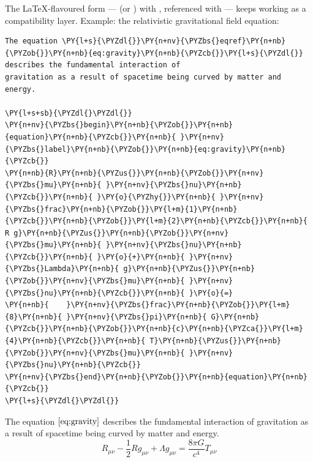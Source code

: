 \documentclass[a4paper,twoside]{article}
\begin{document}
The \LaTeX{}-flavoured form ---  (or )
with , referenced with  --- keeps working as a
compatibility layer. Example: the relativistic gravitational field equation:
\begin{tscode}[lang=latex, engine=pygments]
\begin{Verbatim}[commandchars=\\\{\},breaklines, breakanywhere, commandchars=\\\{\}]
The equation \PY{l+s}{\PYZdl{}}\PY{n+nv}{\PYZbs{}eqref}\PY{n+nb}{\PYZob{}}\PY{n+nb}{eq:gravity}\PY{n+nb}{\PYZcb{}}\PY{l+s}{\PYZdl{}} describes the fundamental interaction of
gravitation as a result of spacetime being curved by matter and energy.

\PY{l+s+sb}{\PYZdl{}\PYZdl{}}
\PY{n+nv}{\PYZbs{}begin}\PY{n+nb}{\PYZob{}}\PY{n+nb}{equation}\PY{n+nb}{\PYZcb{}}\PY{n+nb}{ }\PY{n+nv}{\PYZbs{}label}\PY{n+nb}{\PYZob{}}\PY{n+nb}{eq:gravity}\PY{n+nb}{\PYZcb{}}
\PY{n+nb}{R}\PY{n+nb}{\PYZus{}}\PY{n+nb}{\PYZob{}}\PY{n+nv}{\PYZbs{}mu}\PY{n+nb}{ }\PY{n+nv}{\PYZbs{}nu}\PY{n+nb}{\PYZcb{}}\PY{n+nb}{ }\PY{o}{\PYZhy{}}\PY{n+nb}{ }\PY{n+nv}{\PYZbs{}frac}\PY{n+nb}{\PYZob{}}\PY{l+m}{1}\PY{n+nb}{\PYZcb{}}\PY{n+nb}{\PYZob{}}\PY{l+m}{2}\PY{n+nb}{\PYZcb{}}\PY{n+nb}{ R g}\PY{n+nb}{\PYZus{}}\PY{n+nb}{\PYZob{}}\PY{n+nv}{\PYZbs{}mu}\PY{n+nb}{ }\PY{n+nv}{\PYZbs{}nu}\PY{n+nb}{\PYZcb{}}\PY{n+nb}{ }\PY{o}{+}\PY{n+nb}{ }\PY{n+nv}{\PYZbs{}Lambda}\PY{n+nb}{ g}\PY{n+nb}{\PYZus{}}\PY{n+nb}{\PYZob{}}\PY{n+nv}{\PYZbs{}mu}\PY{n+nb}{ }\PY{n+nv}{\PYZbs{}nu}\PY{n+nb}{\PYZcb{}}\PY{n+nb}{ }\PY{o}{=}
\PY{n+nb}{    }\PY{n+nv}{\PYZbs{}frac}\PY{n+nb}{\PYZob{}}\PY{l+m}{8}\PY{n+nb}{ }\PY{n+nv}{\PYZbs{}pi}\PY{n+nb}{ G}\PY{n+nb}{\PYZcb{}}\PY{n+nb}{\PYZob{}}\PY{n+nb}{c}\PY{n+nb}{\PYZca{}}\PY{l+m}{4}\PY{n+nb}{\PYZcb{}}\PY{n+nb}{ T}\PY{n+nb}{\PYZus{}}\PY{n+nb}{\PYZob{}}\PY{n+nv}{\PYZbs{}mu}\PY{n+nb}{ }\PY{n+nv}{\PYZbs{}nu}\PY{n+nb}{\PYZcb{}}
\PY{n+nv}{\PYZbs{}end}\PY{n+nb}{\PYZob{}}\PY{n+nb}{equation}\PY{n+nb}{\PYZcb{}}
\PY{l+s}{\PYZdl{}\PYZdl{}}
\end{Verbatim}
\end{tscode}
The equation $\eqref{eq:gravity}$ describes the fundamental interaction of gravitation as a result of spacetime being curved by matter and energy.
\begin{equation} \label{eq:gravity}
R_{\mu \nu} - \frac{1}{2} R g_{\mu \nu} + \Lambda g_{\mu \nu} = \frac{8 \pi G}{c^4} T_{\mu \nu}
\end{equation}
\end{document}
